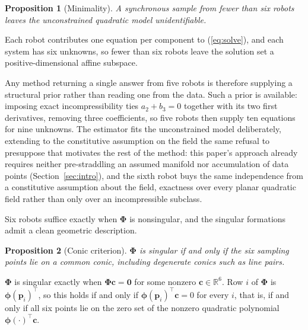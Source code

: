 \documentclass[lettersize,journal]{IEEEtran}
\newtheorem{proposition}{Proposition}
\begin{document}
\begin{proposition}[Minimality]
\label{prop:minimality}
A synchronous sample from fewer than six robots leaves the
unconstrained quadratic model unidentifiable.
\end{proposition}

\begin{IEEEproof}
Each robot contributes one equation per component to (\ref{eq:solve}),
and each system has six unknowns, so fewer than six robots leave the
solution set a positive-dimensional affine subspace.
\end{IEEEproof}

Any method returning a single answer from five robots is therefore
supplying a structural prior rather than reading one from the data. Such
a prior is available: imposing exact incompressibility ties $a_2 + b_3 =
0$ together with its two first derivatives, removing three coefficients,
so five robots then supply ten equations for nine unknowns. The
estimator fits the unconstrained model deliberately, extending to the
constitutive assumption on the field the same refusal to presuppose
that motivates the rest of the method: this paper's approach already
requires neither pre-straddling an assumed manifold nor accumulation of
data points (Section~\ref{sec:intro}), and the sixth robot buys the same
independence from a constitutive assumption about the field, exactness
over every planar quadratic field rather than only over an incompressible
subclass.\label{rem:minimality_priors}

Six robots suffice exactly when $\boldsymbol{\Phi}$ is nonsingular, and
the singular formations admit a clean geometric description.

\begin{proposition}[Conic criterion]
\label{prop:conic}
$\boldsymbol{\Phi}$ is singular if and only if the six sampling points
lie on a common conic, including degenerate conics such as line pairs.
\end{proposition}

\begin{IEEEproof}
$\boldsymbol{\Phi}$ is singular exactly when
$\boldsymbol{\Phi}\mathbf{c} = \mathbf{0}$ for some nonzero
$\mathbf{c} \in \mathbb{R}^6$. Row $i$ of $\boldsymbol{\Phi}$ is
$\boldsymbol{\phi}(\mathbf{p}_i)^\top$, so this holds if and only if
$\boldsymbol{\phi}(\mathbf{p}_i)^\top \mathbf{c} = 0$ for every $i$,
that is, if and only if all six points lie on the zero set of the nonzero
quadratic polynomial $\boldsymbol{\phi}(\cdot)^\top \mathbf{c}$.
\end{IEEEproof}
\end{document}
